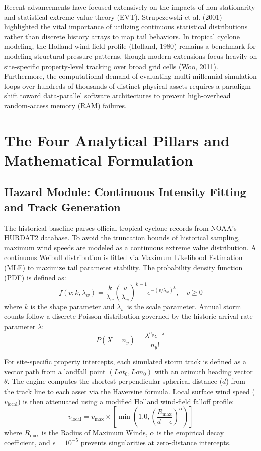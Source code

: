 \documentclass[11pt,article]{article}
\begin{document}
Recent advancements have focused extensively on the impacts of non-stationarity and statistical extreme value theory (EVT). Strupczewski et al. (2001) highlighted the vital importance of utilizing continuous statistical distributions rather than discrete history arrays to map tail behaviors. In tropical cyclone modeling, the Holland wind-field profile (Holland, 1980) remains a benchmark for modeling structural pressure patterns, though modern extensions focus heavily on site-specific property-level tracking over broad grid cells (Woo, 2011). Furthermore, the computational demand of evaluating multi-millennial simulation loops over hundreds of thousands of distinct physical assets requires a paradigm shift toward data-parallel software architectures to prevent high-overhead random-access memory (RAM) failures.

\section{The Four Analytical Pillars and Mathematical Formulation}

\subsection{Hazard Module: Continuous Intensity Fitting and Track Generation}
The historical baseline parses official tropical cyclone records from NOAA's HURDAT2 database. To avoid the truncation bounds of historical sampling, maximum wind speeds are modeled as a continuous extreme value distribution. A continuous Weibull distribution is fitted via Maximum Likelihood Estimation (MLE) to maximize tail parameter stability. The probability density function (PDF) is defined as:
\begin{equation}
f(v; k, \lambda_{w}) = \frac{k}{\lambda_{w}} \left(\frac{v}{\lambda_{w}}\right)^{k-1} e^{-(v/\lambda_{w})^k}, \quad v \ge 0
\end{equation}
where $k$ is the shape parameter and $\lambda_{w}$ is the scale parameter. Annual storm counts follow a discrete Poisson distribution governed by the historic arrival rate parameter $\lambda$:
\begin{equation}
P(X = n_y) = \frac{\lambda^{n_y} e^{-\lambda}}{n_y!}
\end{equation}

For site-specific property intercepts, each simulated storm track is defined as a vector path from a landfall point $(Lat_0, Lon_0)$ with an azimuth heading vector $\theta$. The engine computes the shortest perpendicular spherical distance ($d$) from the track line to each asset via the Haversine formula. Local surface wind speed ($v_{\text{local}}$) is then attenuated using a modified Holland wind-field falloff profile:
\begin{equation}
v_{\text{local}} = v_{\text{max}} \times \left[ \min\left(1.0, \left(\frac{R_{\text{max}}}{d + \epsilon}\right)^{\alpha}\right) \right]
\end{equation}
where $R_{\text{max}}$ is the Radius of Maximum Winds, $\alpha$ is the empirical decay coefficient, and $\epsilon = 10^{-5}$ prevents singularities at zero-distance intercepts.
\end{document}
